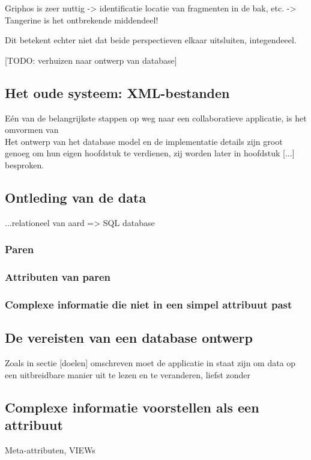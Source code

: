 Griphos is zeer nuttig -> identificatie locatie van fragmenten in de bak, etc. -> Tangerine is het ontbrekende middendeel!

Dit betekent echter niet dat beide perspectieven elkaar uitsluiten, integendeeel.
 
[TODO: verhuizen naar ontwerp van database]

\subsection{Het oude systeem: XML-bestanden}

E\'en van de belangrijkste stappen op weg naar een collaboratieve applicatie, is het omvormen van\\

Het ontwerp van het database model en de implementatie details zijn groot genoeg om hun eigen hoofdstuk te verdienen, zij worden later in hoofdstuk [...] besproken.\\

\subsection{Ontleding van de data}
...relationeel van aard => SQL database

\subsubsection{Paren}

\subsubsection{Attributen van paren}

\subsubsection{Complexe informatie die niet in een simpel attribuut past}

\subsection{De vereisten van een database ontwerp}
Zoals in sectie [doelen] omschreven moet de applicatie in staat zijn om data op een uitbreidbare manier uit te lezen en te veranderen, liefst zonder 

\subsection{Complexe informatie voorstellen als een attribuut}
Meta-attributen, VIEWs

